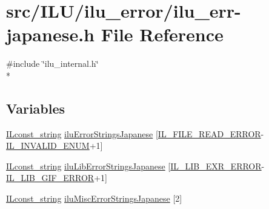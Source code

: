 \hypertarget{ilu__err-japanese_8h}{\section{src/\-I\-L\-U/ilu\-\_\-error/ilu\-\_\-err-\/japanese.h File Reference}
\label{ilu__err-japanese_8h}
}
{\ttfamily \#include \char`\"{}ilu\-\_\-internal.\-h\char`\"{}}\\*
\subsection*{Variables}
\begin{DoxyCompactItemize}
\item 
\hyperlink{il_8h_a103ef32cc870d648d471aff6c7076747}{I\-Lconst\-\_\-string} \hyperlink{ilu__err-japanese_8h_ae8129baae6553dc73a8a6c6ad9f3c0d2}{ilu\-Error\-Strings\-Japanese} \mbox{[}\hyperlink{il_8h_ae70fdd3b6e8434371177ed2547b75841}{I\-L\-\_\-\-F\-I\-L\-E\-\_\-\-R\-E\-A\-D\-\_\-\-E\-R\-R\-O\-R}-\/\hyperlink{il_8h_adf311fb99b5d12d7ef3795b0ab3dd918}{I\-L\-\_\-\-I\-N\-V\-A\-L\-I\-D\-\_\-\-E\-N\-U\-M}+1\mbox{]}
\item 
\hyperlink{il_8h_a103ef32cc870d648d471aff6c7076747}{I\-Lconst\-\_\-string} \hyperlink{ilu__err-japanese_8h_ad0377dc987638bba9e5da85981694986}{ilu\-Lib\-Error\-Strings\-Japanese} \mbox{[}\hyperlink{il_8h_a4792903188701caaeaa625e49af84a66}{I\-L\-\_\-\-L\-I\-B\-\_\-\-E\-X\-R\-\_\-\-E\-R\-R\-O\-R}-\/\hyperlink{il_8h_ab2d4eb290bfe9e2e5c8d590213034e50}{I\-L\-\_\-\-L\-I\-B\-\_\-\-G\-I\-F\-\_\-\-E\-R\-R\-O\-R}+1\mbox{]}
\item 
\hyperlink{il_8h_a103ef32cc870d648d471aff6c7076747}{I\-Lconst\-\_\-string} \hyperlink{ilu__err-japanese_8h_a66bdaea141bc0db33848117b1152dbf7}{ilu\-Misc\-Error\-Strings\-Japanese} \mbox{[}2\mbox{]}
\end{DoxyCompactItemize}


